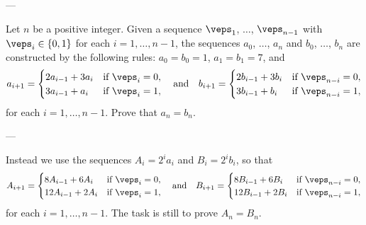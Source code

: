 
---

Let $n$ be a positive integer. Given a sequence $\veps_1$, $\ldots$, $\veps_{n-1}$ with $\veps_i\in\{0,1\}$ for each $i=1,\ldots,n-1$, the sequences $a_0$, $\ldots$, $a_n$ and $b_0$, $\ldots$, $b_n$ are constructed by the following rules: $a_0=b_0=1$, $a_1=b_1=7$, and
\[
    a_{i+1}=
    \begin{cases}
        2a_{i-1}+3a_i&\text{if }\veps_i=0,\\
        3a_{i-1}+a_i&\text{if }\veps_i=1,
    \end{cases}
    \quad\text{and}\quad
    b_{i+1}=
    \begin{cases}
        2b_{i-1}+3b_i&\text{if }\veps_{n-i}=0,\\
        3b_{i-1}+b_i&\text{if }\veps_{n-i}=1,
    \end{cases}
\]
for each $i=1,\ldots,n-1$. Prove that $a_n=b_n$.

---

Instead we use the sequences $A_i=2^ia_i$ and $B_i=2^ib_i$, so that
\[
    A_{i+1}=
    \begin{cases}
        8A_{i-1}+6A_i&\text{if }\veps_i=0,\\
        12A_{i-1}+2A_i&\text{if }\veps_i=1,
    \end{cases}
    \quad\text{and}\quad
    B_{i+1}=
    \begin{cases}
        8B_{i-1}+6B_i&\text{if }\veps_{n-i}=0,\\
        12B_{i-1}+2B_i&\text{if }\veps_{n-i}=1,
    \end{cases}
\]
for each $i=1,\ldots,n-1$. The task is still to prove $A_n=B_n$.

